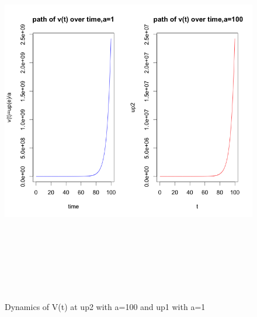 \documentclass[12pt]{article}
\numberwithin{equation}{subsection} %
\begin{document}
\begin{figure}[ht!]
\centering
\includegraphics[width=170mm,height=170mm]{11b.png}
\caption{Dynamics of V(t) at  up2 with a=100 and up1 with a=1\label{overflow}}
\end{figure}





\end{document}

